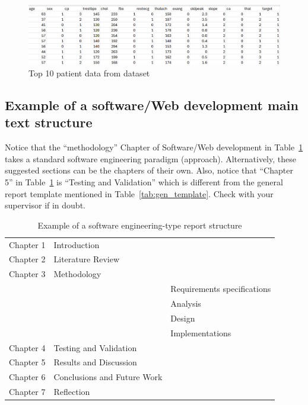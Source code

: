 \begin{figure}
    \centering
    \includegraphics[width=1.0\textwidth]{figures/Datasettop10patients.png}
    \caption{Top 10 patient data from dataset}
    \label{fig:example}
\end{figure}

\subsection{Example of a software/Web development main text structure}
\label{subsec:se_chpters}
Notice that the ``methodology'' Chapter of Software/Web development in Table~\ref{tab:soft_eng_temp} takes a standard software engineering paradigm (approach). Alternatively, these suggested sections can be the chapters of their own. Also, notice that ``Chapter 5'' in Table~\ref{tab:soft_eng_temp} is ``Testing and Validation'' which is different from the general report template mentioned in Table~\ref{tab:gen_template}. Check with your supervisor if in doubt.
\begin{table}[ht!]
    \centering
    \caption{Example of a software engineering-type report structure}
    \label{tab:soft_eng_temp}
    \begin{tabular}{lll}     
        \toprule                   
        Chapter 1 & Introduction   &    \\        
        Chapter 2 & Literature Review  &    \\                   
        Chapter 3 & Methodology   &    \\
        &               & Requirements specifications   \\
        &               & Analysis   \\
        &               & Design   \\
        &               & Implementations   \\
        Chapter 4 & Testing and Validation  &    \\
        Chapter 5 & Results and Discussion      &    \\
        Chapter 6 & Conclusions and Future Work  &    \\        
        Chapter 7 & Reflection  &    \\                          
        \bottomrule
    \end{tabular}
\end{table}

